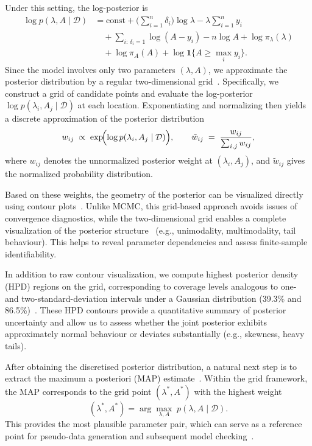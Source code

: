 Under this setting, the log-posterior is
\begin{align}
\log p(\lambda, A \mid \mathcal D)
&= \text{const}
   + \Big(\sum_{i=1}^n \delta_i\Big)\log \lambda
   - \lambda \sum_{i=1}^n y_i \nonumber\\[6pt]
&\quad + \sum_{i:\,\delta_i=1}\log(A-y_i)
   - n \log A
   + \log \pi_\lambda(\lambda) \nonumber \\[6pt]
&\quad + \log \pi_A(A) + \log \mathbf 1\{A \ge \max_i y_i\}.
\end{align}
Since the model involves only two parameters $(\lambda, A)$, we approximate the posterior distribution by a regular two-dimensional grid~\cite{mcelreath2021grid}. Specifically, we construct a grid of candidate points and evaluate the log-posterior $\log p(\lambda_i, A_j \mid \mathcal D)$ at each location. Exponentiating and normalizing then yields a discrete approximation of the posterior distribution~\cite{ORMEROD201145,mcelreath2021grid}
\begin{equation}
    w_{ij} \;\propto\; \exp\!\Bigl(\log p(\lambda_i, A_j \mid \mathcal D)\Bigr), \qquad \tilde w_{ij} \;=\; \frac{w_{ij}}{\sum_{i,j} w_{ij}} ,
\end{equation}
where $w_{ij}$ denotes the unnormalized posterior weight at $(\lambda_i,A_j)$, and $\tilde w_{ij}$ gives the normalized probability distribution.

Based on these weights, the geometry of the posterior can be visualized directly using contour plots~\cite{maclaren2020estimatedidentifiabilityestimabilitycausal, mcelreath2021grid}. Unlike MCMC, this grid-based approach avoids issues of convergence diagnostics, while the two-dimensional grid enables a complete visualization of the posterior structure~\cite{joshi2016improvinggridbasedbayesian} (e.g., unimodality, multimodality, tail behaviour). This helps to reveal parameter dependencies and assess finite-sample identifiability.

In addition to raw contour visualization, we compute highest posterior density (HPD) regions on the grid, corresponding to coverage levels analogous to one- and two-standard-deviation intervals under a Gaussian distribution (39.3\% and 86.5\%)~\cite{kocev2021modeling}. These HPD contours provide a quantitative summary of posterior uncertainty and allow us to assess whether the joint posterior exhibits approximately normal behaviour or deviates substantially (e.g., skewness, heavy tails).

After obtaining the discretised posterior distribution, a natural next step is to extract the maximum a posteriori (MAP) estimate~\cite{gelman1995bayesian}. Within the grid framework, the MAP corresponds to the grid point $(\lambda^*, A^*)$ with the highest weight
\begin{equation}
    (\lambda^*, A^*) = \arg\max_{\lambda,A} \; p(\lambda,A \mid \mathcal D).
\end{equation}
This provides the most plausible parameter pair, which can serve as a reference point for pseudo-data generation and subsequent model checking~\cite{robert2007bayesian, gelman1995bayesian}.



